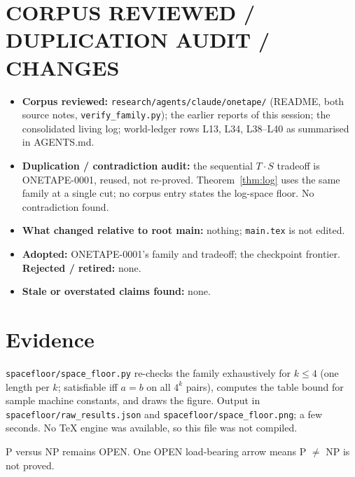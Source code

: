 \documentclass[11pt]{article}
\begin{document}
\section{CORPUS REVIEWED / DUPLICATION AUDIT / CHANGES}
\begin{itemize}
\item \textbf{Corpus reviewed:} \texttt{research/agents/claude/onetape/} (README, both source notes, \texttt{verify\_family.py}); the earlier reports of this session; the consolidated living log; world-ledger rows L13, L34, L38--L40 as summarised in AGENTS.md.
\item \textbf{Duplication / contradiction audit:} the sequential $T\cdot S$ tradeoff is ONETAPE-0001, reused, not re-proved. Theorem~\ref{thm:log} uses the same family at a single cut; no corpus entry states the log-space floor. No contradiction found.
\item \textbf{What changed relative to root main:} nothing; \texttt{main.tex} is not edited.
\item \textbf{Adopted:} ONETAPE-0001's family and tradeoff; the checkpoint frontier. \textbf{Rejected / retired:} none.
\item \textbf{Stale or overstated claims found:} none.
\end{itemize}

\section{Evidence}
\texttt{spacefloor/space\_floor.py} re-checks the family exhaustively for $k\le4$ (one length per $k$; satisfiable iff $a=b$ on all $4^{k}$ pairs), computes the table bound for sample machine constants, and draws the figure. Output in \texttt{spacefloor/raw\_results.json} and \texttt{spacefloor/space\_floor.png}; a few seconds. No TeX engine was available, so this file was not compiled.

\medskip\noindent P versus NP remains OPEN. One OPEN load-bearing arrow means P $\ne$ NP is not proved.
\end{document}
